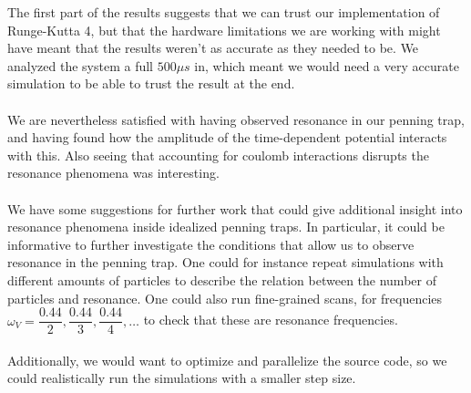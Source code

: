 The first part of the results suggests that we can trust our implementation of Runge-Kutta 4, but that the hardware limitations we are working with might have meant that the results weren't as accurate as they needed to be. We analyzed the system a full $500 \mu s$ in, which meant we would need a very accurate simulation to be able to trust the result at the end.
\\\\
We are nevertheless satisfied with having observed resonance in our penning trap, and having found how the amplitude of the time-dependent potential interacts with this. Also seeing that accounting for coulomb interactions disrupts the resonance phenomena was interesting. 
\\\\
We have some suggestions for further work that could give additional insight into resonance phenomena inside idealized penning traps. In particular, it could be informative to further investigate the conditions that allow us to observe resonance in the penning trap. One could for instance repeat simulations with different amounts of particles to describe the relation between the number of particles and resonance. One could also run fine-grained scans, for frequencies $\omega_V = \dfrac{0.44}{2}, \dfrac{0.44}{3}, \dfrac{0.44}{4}, \ldots$ to check that these are resonance frequencies.
\\\\
Additionally, we would want to optimize and parallelize the source code, so we could realistically run the simulations with a smaller step size. 
